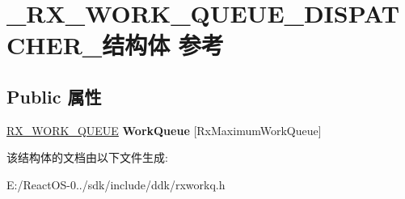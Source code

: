 \hypertarget{struct___r_x___w_o_r_k___q_u_e_u_e___d_i_s_p_a_t_c_h_e_r__}{}\section{\+\_\+\+R\+X\+\_\+\+W\+O\+R\+K\+\_\+\+Q\+U\+E\+U\+E\+\_\+\+D\+I\+S\+P\+A\+T\+C\+H\+E\+R\+\_\+结构体 参考}
\label{struct___r_x___w_o_r_k___q_u_e_u_e___d_i_s_p_a_t_c_h_e_r__}
\subsection*{Public 属性}
\begin{DoxyCompactItemize}
\item 
\mbox{\label{struct___r_x___w_o_r_k___q_u_e_u_e___d_i_s_p_a_t_c_h_e_r___a949bf8ad5464397757092d5cf5bbf0dd}} 
\hyperlink{struct___r_x___w_o_r_k___q_u_e_u_e__}{R\+X\+\_\+\+W\+O\+R\+K\+\_\+\+Q\+U\+E\+UE} {\bfseries Work\+Queue} \mbox{[}Rx\+Maximum\+Work\+Queue\mbox{]}
\end{DoxyCompactItemize}


该结构体的文档由以下文件生成\+:\begin{DoxyCompactItemize}
\item 
E\+:/\+React\+O\+S-\/0../sdk/include/ddk/rxworkq.\+h\end{DoxyCompactItemize}

